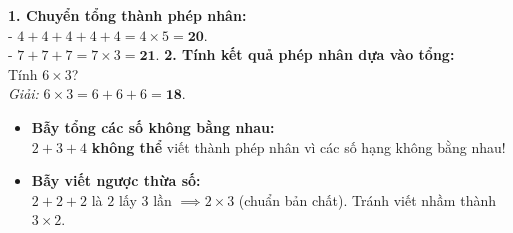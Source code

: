 \documentclass[11pt,a4paper]{article}
\begin{document}
\vspace{-1.5mm}
\noindent
\begin{minipage}[t]{0.49\textwidth}\vspace{0pt}
\begin{tcolorbox}[
  enhanced,
  colback=green!4!white,
  colframe=green!60!black,
  arc=2mm, boxrule=0.8pt,
  left=2mm, right=2mm, top=1.8mm, bottom=1.8mm,
  title={\footnotesize\bfseries\color{white}\faCheckCircle\ 4. Ví dụ thực hành chuẩn mực}
]
{\footnotesize
\textbf{1. Chuyển tổng thành phép nhân:}\\
- $4 + 4 + 4 + 4 + 4 = 4 \times 5 = \mathbf{20}$.\\
- $7 + 7 + 7 = 7 \times 3 = \mathbf{21}$.
\textbf{2. Tính kết quả phép nhân dựa vào tổng:}\\
Tính $6 \times 3$?\\
\textit{Giải:} $6 \times 3 = 6 + 6 + 6 = \mathbf{18}$.
}
\end{tcolorbox}
\end{minipage}
\hfill
\begin{minipage}[t]{0.49\textwidth}\vspace{0pt}
\begin{tcolorbox}[
  enhanced,
  colback=red!4!white,
  colframe=red!75!black,
  arc=2mm, boxrule=0.8pt,
  left=2mm, right=2mm, top=1.8mm, bottom=1.8mm,
  title={\footnotesize\bfseries\color{white}\faExclamationTriangle\ 5. Mẹo tránh bẫy trắc nghiệm}
]
{\footnotesize
\begin{itemize}\setlength{\itemsep}{1pt}\setlength{\leftskip}{-2.5mm}
  \item \textbf{Bẫy tổng các số không bằng nhau:}\\
  $2 + 3 + 4$ \textbf{không thể} viết thành phép nhân vì các số hạng không bằng nhau!
  \item \textbf{Bẫy viết ngược thừa số:}\\
  $2 + 2 + 2$ là $2$ lấy $3$ lần $\implies 2 \times 3$ (chuẩn bản chất). Tránh viết nhầm thành $3 \times 2$.
\end{itemize}
}
\end{tcolorbox}
\end{minipage}
\end{document}

